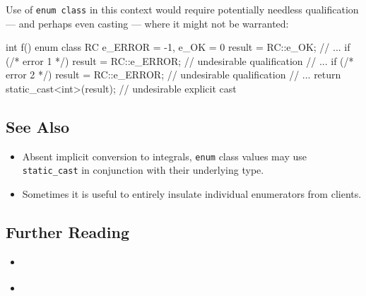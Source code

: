\noindent Use of \texttt{enum}~\texttt{class} in this context would require
potentially needless qualification --- and perhaps even casting ---
where it might not be warranted:

\begin{emcppslisting}[emcppserrorlines={5,7}]
int f()
{
    enum class RC { e_ERROR = -1, e_OK = 0 } result = RC::e_OK;
    // ...
    if (/* error 1 */) { result = RC::e_ERROR; } // undesirable qualification
    // ...
    if (/* error 2 */) { result = RC::e_ERROR; } // undesirable qualification
    // ...
    return static_cast<int>(result);  // undesirable explicit cast
}
\end{emcppslisting}

\subsection[See Also]{See Also}\label{see-also}

\begin{itemize}
\item{Absent implicit conversion to integrals, \texttt{enum} class values may use \texttt{static\_cast} in conjunction with their underlying type.}
\item{Sometimes it is useful to entirely insulate individual enumerators from clients.}
\end{itemize}

\subsection[Further Reading]{Further Reading}\label{further-reading}

\begin{itemize}
\item{\cite{miller19}}
\item{\cite{meyers15}}
\end{itemize}



